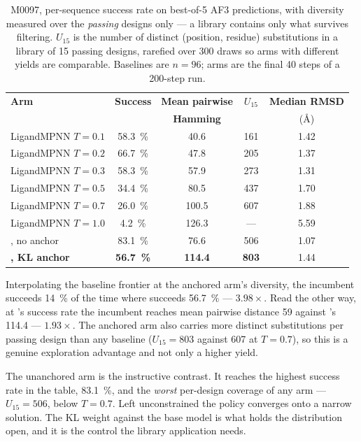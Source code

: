 \begin{table}[htbp]
\centering
\caption{M0097, per-sequence success rate on best-of-5 AF3 predictions, with
diversity measured over the \emph{passing} designs only --- a library contains
only what survives filtering. $U_{15}$ is the number of distinct
(position, residue) substitutions in a library of 15 passing designs, rarefied
over 300 draws so arms with different yields are comparable. Baselines are
$n = 96$; \cleo{} arms are the final 40 steps of a 200-step run.}
\label{tab:ame-frontier}
\begin{tabular}{@{}lcccc@{}}
\toprule
\textbf{Arm} & \textbf{Success} & \textbf{Mean pairwise} & $U_{15}$ &
\textbf{Median RMSD} \\
             &                  & \textbf{Hamming}       &          &
(\si{\angstrom}) \\
\midrule
LigandMPNN $T{=}0.1$ & \SI{58.3}{\percent} & 40.6  & 161 & 1.42 \\
LigandMPNN $T{=}0.2$ & \SI{66.7}{\percent} & 47.8  & 205 & 1.37 \\
LigandMPNN $T{=}0.3$ & \SI{58.3}{\percent} & 57.9  & 273 & 1.31 \\
LigandMPNN $T{=}0.5$ & \SI{34.4}{\percent} & 80.5  & 437 & 1.70 \\
LigandMPNN $T{=}0.7$ & \SI{26.0}{\percent} & 100.5 & 607 & 1.88 \\
LigandMPNN $T{=}1.0$ & \SI{4.2}{\percent}  & 126.3 & --- & 5.59 \\
\midrule
\cleo{}, no anchor         & \SI{83.1}{\percent} & 76.6 & 506 & 1.07 \\
\textbf{\cleo{}, KL anchor} & \textbf{\SI{56.7}{\percent}} & \textbf{114.4} &
  \textbf{803} & 1.44 \\
\bottomrule
\end{tabular}
\end{table}

Interpolating the baseline frontier at the anchored arm's diversity, the
incumbent succeeds \SI{14}{\percent} of the time where \cleo{} succeeds
\SI{56.7}{\percent} --- $\mathbf{3.98\times}$. Read the other way, at \cleo{}'s
success rate the incumbent reaches mean pairwise distance \num{59} against
\cleo{}'s \num{114.4} --- $\mathbf{1.93\times}$. The anchored arm also carries
more distinct substitutions per passing design than any baseline
($U_{15} = 803$ against \num{607} at $T{=}0.7$), so this is a genuine
exploration advantage and not only a higher yield.

The unanchored arm is the instructive contrast. It reaches the highest success
rate in the table, \SI{83.1}{\percent}, and the \emph{worst} per-design coverage
of any \cleo{} arm --- $U_{15} = 506$, below $T{=}0.7$. Left unconstrained the
policy converges onto a narrow solution. The KL weight against the base model is
what holds the distribution open, and it is the control the library application
needs.

